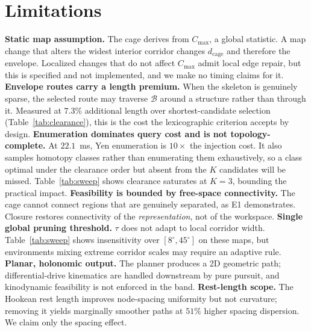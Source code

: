 \documentclass[conference]{IEEEtran}
\begin{document}
\section{Limitations}
\textbf{Static map assumption.} The cage derives from $C_{\max}$, a global statistic. A map change that alters the widest interior corridor changes $d_{\mathrm{cage}}$ and therefore the envelope. Localized changes that do not affect $C_{\max}$ admit local edge repair, but this is specified and not implemented, and we make no timing claims for it.
\textbf{Envelope routes carry a length premium.} When the skeleton is genuinely sparse, the selected route may traverse $\mathcal{B}$ around a structure rather than through it. Measured at $7.3\%$ additional length over shortest-candidate selection (Table~\ref{tab:clearance}), this is the cost the lexicographic criterion accepts by design.
\textbf{Enumeration dominates query cost and is not topology-complete.} At $22.1$~ms, Yen enumeration is $10\times$ the injection cost. It also samples homotopy classes rather than enumerating them exhaustively, so a class optimal under the clearance order but absent from the $K$ candidates will be missed. Table~\ref{tab:sweep} shows clearance saturates at $K=3$, bounding the practical impact.
\textbf{Feasibility is bounded by free-space connectivity.} The cage cannot connect regions that are genuinely separated, as E1 demonstrates. Closure restores connectivity of the \emph{representation}, not of the workspace.
\textbf{Single global pruning threshold.} $\tau$ does not adapt to local corridor width. Table~\ref{tab:sweep} shows insensitivity over $[8^\circ,45^\circ]$ on these maps, but environments mixing extreme corridor scales may require an adaptive rule.
\textbf{Planar, holonomic output.} The planner produces a 2D geometric path; differential-drive kinematics are handled downstream by pure pursuit, and kinodynamic feasibility is not enforced in the band.
\textbf{Rest-length scope.} The Hookean rest length improves node-spacing uniformity but not curvature; removing it yields marginally smoother paths at $51\%$ higher spacing dispersion. We claim only the spacing effect.
\end{document}
